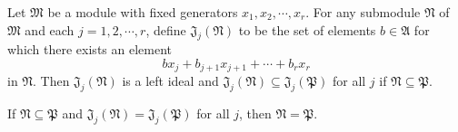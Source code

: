 Let $\mathfrak{M}$ be a module with fixed generators $x_1, x_2, \cdots, x_r$. For any submodule $\mathfrak{N}$ of $\mathfrak{M}$ and each $j = 1, 2, \cdots, r$, define $\mathfrak{J}_j(\mathfrak{N})$ to be the set of elements $b \in \mathfrak{A}$ for which there exists an element
$$bx_j + b_{j+1}x_{j+1} + \cdots + b_r x_r$$
in $\mathfrak{N}$. Then $\mathfrak{J}_j(\mathfrak{N})$ is a left ideal and $\mathfrak{J}_j(\mathfrak{N}) \subseteq \mathfrak{J}_j(\mathfrak{P})$ for all $j$ if $\mathfrak{N} \subseteq \mathfrak{P}$.

If $\mathfrak{N} \subseteq \mathfrak{P}$ and $\mathfrak{J}_j(\mathfrak{N}) = \mathfrak{J}_j(\mathfrak{P})$ for all $j$, then $\mathfrak{N} = \mathfrak{P}$.
